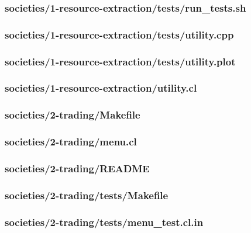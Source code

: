 \documentclass{article}
\begin{document}
\subsubsection*{societies/1-resource-extraction/tests/run\_tests.sh}


\subsubsection*{societies/1-resource-extraction/tests/utility.cpp}


\subsubsection*{societies/1-resource-extraction/tests/utility.plot}


\subsubsection*{societies/1-resource-extraction/utility.cl}


\subsubsection*{societies/2-trading/Makefile}


\subsubsection*{societies/2-trading/menu.cl}


\subsubsection*{societies/2-trading/README}


\subsubsection*{societies/2-trading/tests/Makefile}


\subsubsection*{societies/2-trading/tests/menu\_test.cl.in}

\end{document}
